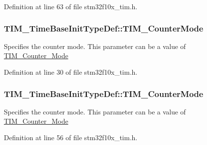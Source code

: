 Definition at line 63 of file stm32f10x\+\_\+tim.\+h.

\subsubsection[{\texorpdfstring{T\+I\+M\+\_\+\+Counter\+Mode}{TIM_CounterMode}}]{ T\+I\+M\+\_\+\+Time\+Base\+Init\+Type\+Def\+::\+T\+I\+M\+\_\+\+Counter\+Mode}\hypertarget{struct_t_i_m___time_base_init_type_def_a3f140f33bebe1190c2e8286e15c676b1}{}\label{struct_t_i_m___time_base_init_type_def_a3f140f33bebe1190c2e8286e15c676b1}
Specifies the counter mode. This parameter can be a value of \hyperlink{group___t_i_m___counter___mode}{T\+I\+M\+\_\+\+Counter\+\_\+\+Mode} 

Definition at line 30 of file stm32f10x\+\_\+tim.\+h.

\subsubsection[{\texorpdfstring{T\+I\+M\+\_\+\+Counter\+Mode}{TIM_CounterMode}}]{ T\+I\+M\+\_\+\+Time\+Base\+Init\+Type\+Def\+::\+T\+I\+M\+\_\+\+Counter\+Mode}\hypertarget{struct_t_i_m___time_base_init_type_def_a0de4138cd939566bc667f21df089e195}{}\label{struct_t_i_m___time_base_init_type_def_a0de4138cd939566bc667f21df089e195}
Specifies the counter mode. This parameter can be a value of \hyperlink{group___t_i_m___counter___mode}{T\+I\+M\+\_\+\+Counter\+\_\+\+Mode} 

Definition at line 56 of file stm32f10x\+\_\+tim.\+h.

